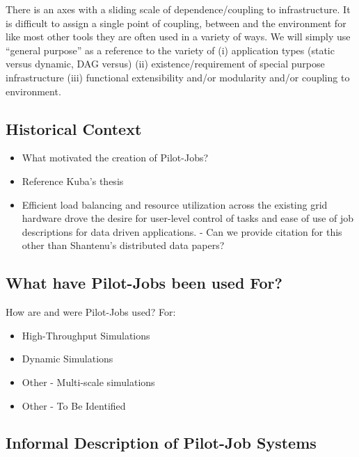 \documentclass{sig-alternate}
\begin{document}


There is an axes with a sliding scale of dependence/coupling to
infrastructure.  It is difficult to assign a single point of coupling,
between \pilotjobs and the environment for like most other tools they
are often used in a variety of ways.  We will simply use ``general
purpose'' as a reference to the variety of (i) application types
(static versus dynamic, DAG versus) (ii) existence/requirement of
special purpose infrastructure (iii) functional extensibility and/or
modularity and/or coupling to environment.

\subsection{Historical Context}

\begin{itemize}
\item What motivated the creation of Pilot-Jobs?
\item Reference Kuba's thesis
\item Efficient load balancing and resource utilization across the existing grid hardware drove the desire for user-level control of tasks and ease of use of job descriptions for data driven applications. - Can we provide citation for this other than Shantenu's distributed data papers?
\end{itemize}

\subsection{What have Pilot-Jobs been used For?}

How are and were Pilot-Jobs used?
For:
\begin{itemize}
\item High-Throughput Simulations
\item Dynamic Simulations
\item Other - Multi-scale simulations  
\item Other - To Be Identified
\end{itemize}

\subsection{Informal Description of Pilot-Job Systems}
\end{document}
